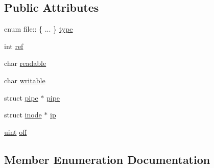 \subsection*{Public Attributes}
\begin{DoxyCompactItemize}
\item 
enum file\+:: \{ ... \}  \hyperlink{structfile_a7dee40626182d2568f513525b2e657bb}{type}
\item 
int \hyperlink{structfile_a41c818f828adea488058bca63e4df23f}{ref}
\item 
char \hyperlink{structfile_a0c5c8eced8bc562dbbecc8d450a6b646}{readable}
\item 
char \hyperlink{structfile_a6e1b641ea1551ac4316a0c11a683df45}{writable}
\item 
struct \hyperlink{structpipe}{pipe} $\ast$ \hyperlink{structfile_a19d83a8d6cb47902fe8c762d2798c198}{pipe}
\item 
struct \hyperlink{structinode}{inode} $\ast$ \hyperlink{structfile_a4fd095f927715574dc2a4f243690e508}{ip}
\item 
\hyperlink{types_8h_a91ad9478d81a7aaf2593e8d9c3d06a14}{uint} \hyperlink{structfile_a94a911be6cc1b1326728392d8b40150d}{off}
\end{DoxyCompactItemize}


\subsection{Member Enumeration Documentation}
